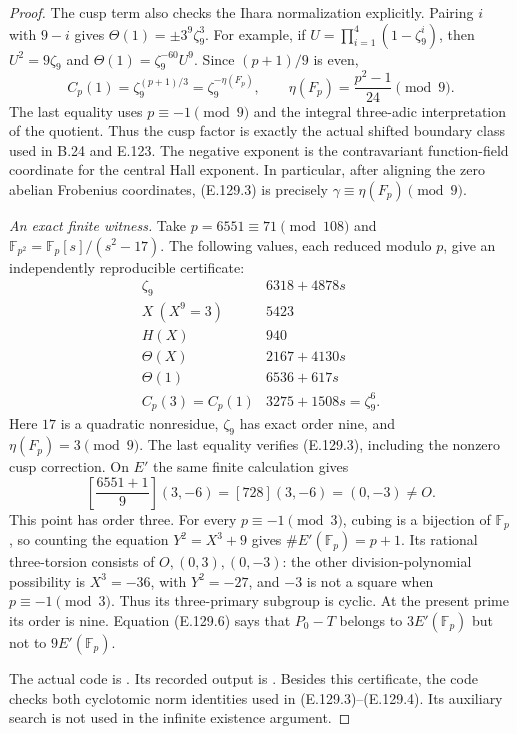 \begin{proof}
The cusp term also checks the Ihara normalization
explicitly. Pairing $i$ with $9-i$ gives
$\Theta(1)=\pm3^9\zeta_9^3$. For example, if
$U=\prod_{i=1}^4(1-\zeta_9^i)$, then
$U^2=9\zeta_9$ and
$\Theta(1)=\zeta_9^{-60}U^9$.
Since $(p+1)/9$ is even,
\[
 C_p(1)=\zeta_9^{(p+1)/3}
       =\zeta_9^{-\eta(F_p)},
 \qquad \eta(F_p)=\frac{p^2-1}{24}\pmod9.
 \tag{E.129.4}
\]
The last equality uses $p\equiv-1\pmod9$ and the
integral three-adic interpretation of the quotient.
Thus the cusp factor is exactly the actual shifted
boundary class used in B.24 and E.123. The negative
exponent is the contravariant function-field coordinate
for the central Hall exponent. In particular, after
aligning the zero abelian Frobenius coordinates,
(E.129.3) is precisely $\gamma\equiv\eta(F_p)\pmod9$.

\emph{An exact finite witness.}
Take $p=6551\equiv71\pmod{108}$ and
$\mathbb F_{p^2}=\mathbb F_p[s]/(s^2-17)$.
The following values, each reduced modulo $p$, give
an independently reproducible certificate:
\[
 \begin{array}{c|c}
 \zeta_9&6318+4878s\\
 X\ (X^9=3)&5423\\
 H(X)&940\\
 \Theta(X)&2167+4130s\\
 \Theta(1)&6536+617s\\
 C_p(3)=C_p(1)&3275+1508s=\zeta_9^6.
 \end{array}
 \tag{E.129.5}
\]
Here $17$ is a quadratic nonresidue, $\zeta_9$ has
exact order nine, and $\eta(F_p)=3\pmod9$.
The last equality verifies (E.129.3), including the
nonzero cusp correction. On $E'$ the same finite
calculation gives
\[
 \left[\frac{6551+1}{9}\right](3,-6)
       =[728](3,-6)=(0,-3)\ne O.
 \tag{E.129.6}
\]
This point has order three.
For every $p\equiv-1\pmod3$, cubing is a bijection
of $\mathbb F_p$, so counting the equation
$Y^2=X^3+9$ gives $\#E'(\mathbb F_p)=p+1$.
Its rational three-torsion consists of $O,(0,3),(0,-3)$:
the other division-polynomial possibility is
$X^3=-36$, with $Y^2=-27$, and $-3$ is not a square
when $p\equiv-1\pmod3$. Thus its three-primary
subgroup is cyclic. At the present prime its order
is nine. Equation (E.129.6) says that $P_0-T$ belongs
to $3E'(\mathbb F_p)$ but not to $9E'(\mathbb F_p)$.

The actual code is
.
Its recorded output is
.
Besides this certificate, the code checks both
cyclotomic norm identities used in (E.129.3)--(E.129.4).
Its auxiliary search is not used in the infinite
existence argument.


\end{proof}
